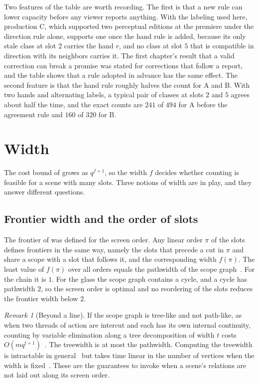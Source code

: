 \documentclass[11pt,twoside,openright]{book}
\theoremstyle{plain}
\theoremstyle{definition}
\theoremstyle{remark}
\newtheorem{remark}[theorem]{Remark}
\begin{document}
Two features of the table are worth recording. The first is that a new rule can lower capacity before any viewer reports anything. With the labeling used here, production C, which supported two perceptual editions at the premiere under the direction rule alone, supports one once the hand rule is added, because its only stale class at slot $2$ carries the hand $r$, and no class at slot $5$ that is compatible in direction with its neighbors carries it. The first chapter's result that a valid correction can break a promise was stated for corrections that follow a report, and the table shows that a rule adopted in advance has the same effect. The second feature is that the hand rule roughly halves the count for A and B. With two hands and alternating labels, a typical pair of classes at slots $2$ and $5$ agrees about half the time, and the exact counts are $241$ of $494$ for A before the agreement rule and $160$ of $320$ for B.

\section{Width}\label{sec:width}

The cost bound of  grows as $q^{f+1}$, so the width $f$ decides whether counting is feasible for a scene with many slots. Three notions of width are in play, and they answer different questions.

\subsection{Frontier width and the order of slots}

The frontier of  was defined for the screen order. Any linear order $\pi$ of the slots defines frontiers in the same way, namely the slots that precede a cut in $\pi$ and share a scope with a slot that follows it, and the corresponding width $f(\pi)$. The least value of $f(\pi)$ over all orders equals the pathwidth of the scope graph~\cite{kinnersley1992}. For the chain it is $1$. For the glass the scope graph contains a cycle, and a cycle has pathwidth $2$, so the screen order is optimal and no reordering of the slots reduces the frontier width below $2$.

\begin{remark}[Beyond a line]\label{rem:tree}
If the scope graph is tree-like and not path-like, as when two threads of action are intercut and each has its own internal continuity, counting by variable elimination along a tree decomposition of width $t$ costs $O(mq^{t+1})$~\cite{dechter1999,robertsonseymour1984}. The treewidth is at most the pathwidth. Computing the treewidth is intractable in general~\cite{arnborg1987} but takes time linear in the number of vertices when the width is fixed~\cite{bodlaender1996}. These are the guarantees to invoke when a scene's relations are not laid out along its screen order.
\end{remark}
\end{document}
